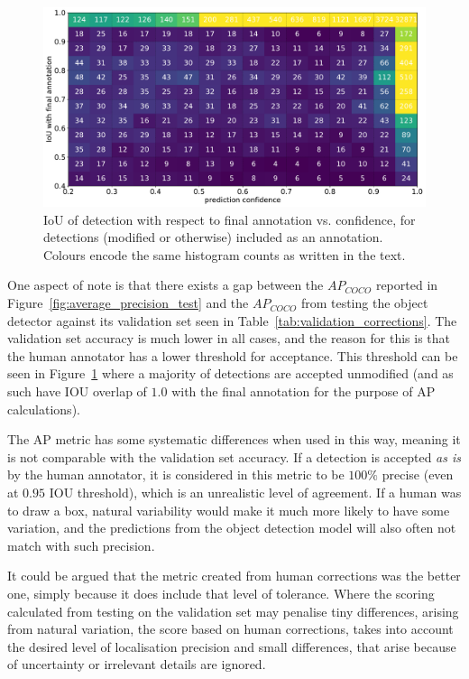 \begin{figure}[ht]
\centering
\includegraphics[width=1.0\linewidth]{charts/scatters/confidence_iou.pdf}
\caption{ IoU of detection with respect to final annotation vs. confidence, for detections (modified or otherwise) included as an annotation. Colours encode the same histogram counts as written in the text. }
\label{fig:iou_confidence}
\end{figure}

One aspect of note is that there exists a gap between the $AP_{COCO}$ reported in Figure~\ref{fig:average_precision_test} and the $AP_{COCO}$ from testing the object detector against its validation set seen in Table~\ref{tab:validation_corrections}. The validation set accuracy is much lower in all cases, and the reason for this is that the human annotator has a lower threshold for acceptance. This threshold can be seen in Figure~\ref{fig:iou_confidence} where a majority of detections are accepted unmodified (and as such have \gls{IOU} overlap of $1.0$ with the final annotation for the purpose of \gls{AP} calculations).

The \gls{AP} metric has some systematic differences when used in this way, meaning it is not comparable with the validation set accuracy. If a detection is accepted \emph{as is} by the human annotator, it is considered in this metric to be $100\%$ precise (even at $0.95$ \gls{IOU} threshold), which is an unrealistic level of agreement. If a human was to draw a box, natural variability would make it much more likely to have some variation, and the predictions from the object detection model will also often not match with such precision.

It could be argued that the metric created from human corrections was the better one, simply because it does include that level of tolerance. Where the scoring calculated from testing on the validation set may penalise tiny differences, arising from natural variation, the score based on human corrections, takes into account the desired level of localisation precision and small differences, that arise because of uncertainty or irrelevant details are ignored.

